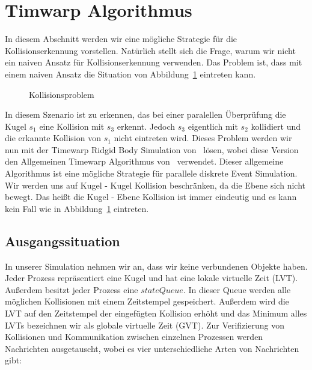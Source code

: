 \documentclass[a4paper, 10pt, openright, parskip, chapterprefix]{scrreprt}
\begin{document}
\section{Timwarp Algorithmus}
\label{sec:TimewarpAlgoritmus}

In diesem Abschnitt werden wir eine mögliche Strategie für die Kollisionserkennung vorstellen. Natürlich  stellt sich die Frage, warum wir nicht ein naiven Ansatz für Kollisionserkennung verwenden. Das Problem ist, dass mit einem naiven Ansatz die Situation von Abbildung~\ref{abb:kollision} eintreten kann.

\begin{figure}[h!]
\centering{}
\caption{Kollisionsproblem}
\label{abb:kollision}
\end{figure}

In diesem Szenario ist zu erkennen, das bei einer paralellen Überprüfung die Kugel $s_1$ eine Kollision mit $s_3$ erkennt. Jedoch $s_3$ eigentlich mit $s_2$ kollidiert und die erkannte Kollision von $s_1$ nicht eintreten wird.  Dieses Problem werden wir nun mit der Timewarp Ridgid Body Simulation von~\cite{timewarp} lösen, wobei diese Version den Allgemeinen Timewarp Algorithmus von~\cite{jefferson} verwendet. Dieser allgemeine Algorithmus ist eine mögliche Strategie für parallele diskrete Event Simulation.\\
Wir werden uns auf Kugel - Kugel Kollision beschränken, da die Ebene sich nicht bewegt. Das heißt die Kugel - Ebene Kollision ist immer eindeutig und es kann kein Fall wie in Abbildung~\ref{abb:kollision} eintreten. 

\subsection{Ausgangssituation}
In unserer Simulation nehmen wir an, dass wir keine verbundenen Objekte haben. Jeder Prozess repräsentiert eine Kugel und hat eine lokale virtuelle Zeit (LVT). Außerdem besitzt jeder Prozess eine $stateQueue$. In dieser Queue werden alle möglichen Kollisionen mit einem Zeitstempel gespeichert.  Außerdem wird die LVT auf den Zeitstempel der eingefügten Kollision erhöht und das Minimum alles LVTs bezeichnen wir als globale virtuelle Zeit (GVT). Zur Verifizierung  von Kollisionen und Kommunikation zwischen einzelnen Prozessen werden Nachrichten ausgetauscht, wobei es vier unterschiedliche Arten von Nachrichten gibt:
\end{document}
